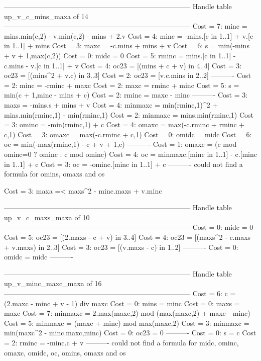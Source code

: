 --------------------------------------------------------------------------------
Handle table up_v_c_mins_maxa of 14
--------------------------------------------------------------------------------
Cost =  7:  minc    = mins.min(c,2) - v.min(c,2) - mins + 2.v
Cost =  4:  minc    = -mins.[c in 1..1] + v.[c in 1..1] + mins
Cost =  3:  maxc    = -c.mins + mins + v
Cost =  6:  s       = min(-mins + v + 1,max(c,2))
Cost =  0:  midc    = 0
Cost =  5:  rminc   = mins.[c in 1..1] - c.mins - v.[c in 1..1] + v
Cost =  4:  oc23    = [(mins + c + v) in 4..4]
Cost =  3:  oc23    = [(mins^2 + v.c) in 3..3]
Cost =  2:  oc23    = [v.c.mins in 2..2]
----------
Cost =  2:  minc    = -rminc + maxc
Cost =  2:  maxc    = rminc + minc
Cost =  5:  s       = min(c + 1,minc - mins + c)
Cost =  2:  rminc   = maxc - minc
----------
Cost =  3:  maxs    = -mins.s + mins + v
Cost =  4:  minmaxc = min(rminc,1)^2 + mins.min(rminc,1) - min(rminc,1)
Cost =  2:  minmaxc = mins.min(rminc,1)
Cost =  3:  ominc   = -min(rminc,1) + c
Cost =  4:  omaxc   = max(-c.rminc + rminc + c,1)
Cost =  3:  omaxc   = max(-c.rminc + c,1)
Cost =  0:  omidc   = midc
Cost =  6:  oc      = min(-max(rminc,1) - c + v + 1,c)
----------
Cost =  1:  omaxc   = (c mod ominc=0 ? ominc : c mod ominc)
Cost =  4:  oc      = minmaxc.[minc in 1..1] - c.[minc in 1..1] + c
Cost =  3:  oc      = -ominc.[minc in 1..1] + c
----------
could not find a formula for omins, omaxs and os

Cost =  3:  maxa =< maxs^2 - minc.maxs + v.minc

--------------------------------------------------------------------------------
Handle table up_v_c_maxs_maxa of 10
--------------------------------------------------------------------------------
Cost =  0:  midc  = 0
Cost =  5:  oc23  = [(2.maxs - c + v) in 3..4]
Cost =  4:  oc23  = [(maxs^2 - c.maxs + v.maxs) in 2..3]
Cost =  3:  oc23  = [(v.maxs - c) in 1..2]
----------
Cost =  0:  omidc = midc
----------


--------------------------------------------------------------------------------
Handle table up_v_minc_maxc_maxa of 16
--------------------------------------------------------------------------------
Cost =  6:  c       = (2.maxc - minc + v - 1) div maxc
Cost =  0:  mins    = minc
Cost =  0:  maxs    = maxc
Cost =  7:  minmaxc = 2.max(maxc,2) mod (max(maxc,2) + maxc - minc)
Cost =  5:  minmaxc = (maxc + minc) mod max(maxc,2)
Cost =  3:  minmaxc = min(maxc^2 - minc.maxc,minc)
Cost =  0:  oc23    = 0
----------
Cost =  0:  s       = c
Cost =  2:  rminc   = -minc.c + v
----------
could not find a formula for midc, ominc, omaxc, omidc, oc, omins, omaxs and os


